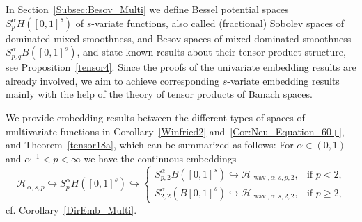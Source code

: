 \documentclass[12pt]{article}
\DeclareMathOperator{\wav}{wav}
\newcommand{\HH}{\mathcal{H}}
\begin{document}
In Section~\ref{Subsec:Besov_Multi} 
we define Bessel potential spaces $S^\alpha_p H([0,1]^s)$ of $s$-variate functions, also called (fractional) Sobolev spaces of dominated mixed smoothness, and Besov spaces of mixed dominated smoothness $S^\alpha_{p,q} B([0,1]^s)$, and state known results about their tensor product structure,
see Proposition~\ref{tensor4}.
Since the proofs of the univariate embedding results  are already involved, we aim to achieve 
corresponding $s$-variate embedding results mainly with the help of the theory of tensor products of Banach spaces. 

We provide embedding results between the different types of spaces of multivariate functions
in Corollary~\ref{Winfried2} 
and~\ref{Cor:Neu_Equation_60+}, 
and Theorem~\ref{tensor18a},
which can be summarized as follows: For $\alpha\in (0, 1)$ and $\alpha^{-1} < p  < \infty$ we have the continuous embeddings
\begin{equation*}
\mathcal{H}_{\alpha, s, p} \hookrightarrow S^\alpha_{p}H([0,1]^s)
\hookrightarrow 
\begin{cases}
S^\alpha_{p, 2}B([0,1]^s) \hookrightarrow \HH_{\wav,\alpha, s, p, 2}, & \text{if $p < 2$,}\\
S^\alpha_{2, 2}(B[0,1]^s) \hookrightarrow \HH_{\wav,\alpha, s, 2, 2}, & \text{if $p \ge 2$,}
\end{cases}
\end{equation*}
cf. Corollary~\ref{DirEmb_Multi}.

\end{document}
